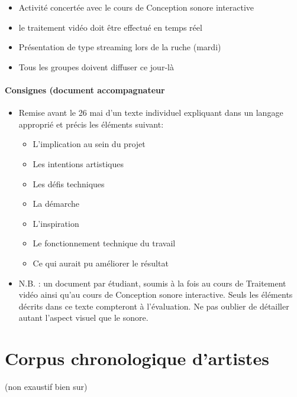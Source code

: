 \documentclass[
]{book}
\providecommand{\tightlist}{%
  \setlength{\itemsep}{0pt}\setlength{\parskip}{0pt}}
\begin{document}
\begin{itemize}
\tightlist
\item
  Activité concertée avec le cours de Conception sonore interactive
\item
  le traitement vidéo doit être effectué en temps réel
\item
  Présentation de type streaming lors de la ruche (mardi)
\item
  Tous les groupes doivent diffuser ce jour-là
\end{itemize}

\hypertarget{consignes-document-accompagnateur}{%
\subsubsection{Consignes (document accompagnateur}\label{consignes-document-accompagnateur}}

\begin{itemize}
\tightlist
\item
  Remise avant le 26 mai d'un texte individuel expliquant dans un langage approprié et précis les éléments suivant:

  \begin{itemize}
  \tightlist
  \item
    L'implication au sein du projet
  \item
    Les intentions artistiques
  \item
    Les défis techniques
  \item
    La démarche
  \item
    L'inspiration
  \item
    Le fonctionnement technique du travail
  \item
    Ce qui aurait pu améliorer le résultat
  \end{itemize}
\item
  N.B. : un document par étudiant, soumis à la fois au cours de Traitement vidéo ainsi qu'au cours de Conception sonore interactive. Seuls les éléments décrits dans ce texte compteront à l'évaluation. Ne pas oublier de détailler autant l'aspect visuel que le sonore.
\end{itemize}

\hypertarget{corpus}{%
\chapter{Corpus chronologique d'artistes}\label{corpus}}

(non exaustif bien sur)
\end{document}
